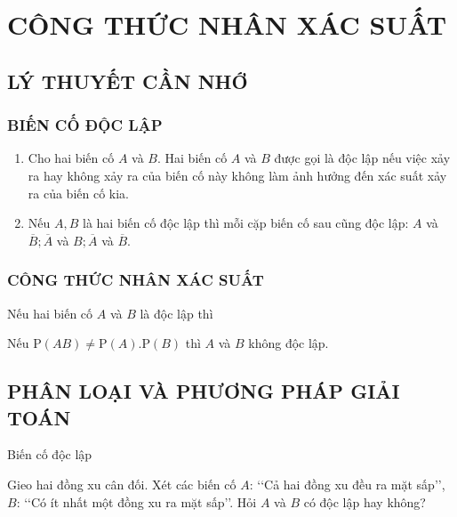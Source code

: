 \section{CÔNG THỨC NHÂN XÁC SUẤT}
\subsection{LÝ THUYẾT CẦN NHỚ}
\subsubsection{BIẾN CỐ ĐỘC LẬP}
\begin{enumerate}[\iconMT]
	\item {} Cho hai biến cố $A$ và $B$. Hai biến cố $A$ và $B$ được gọi là độc lập nếu việc xảy ra hay không xảy ra của biến cố này không làm ảnh hưởng đến xác suất xảy ra của biến cố kia.
	\item {} Nếu $A, B$ là hai biến cố độc lập thì mỗi cặp biến cố sau cũng độc lập: $A$ và $\overline{B} ; \overline{A}$ và $B ; \overline{A}$ và $\overline{B}$.
\end{enumerate}
\subsubsection{CÔNG THỨC NHÂN XÁC SUẤT}

Nếu hai biến cố $A$ và $B$ là độc lập thì 
\begin{luuy}
	Nếu $\mathrm{P}(A B)\ne \mathrm{P}(A) . \mathrm{P}(B)$ thì $A$ và $B$ không độc lập.
\end{luuy}


\subsection{PHÂN LOẠI VÀ PHƯƠNG PHÁP GIẢI TOÁN}

\begin{dang}{Biến cố độc lập}
\end{dang}

\begin{vd}%
	Gieo hai đồng xu cân đối. Xét các biến cố $A$: \lq\lq Cả hai đồng xu đều ra mặt sấp\rq\rq, $B$: \lq\lq Có ít nhất một đồng xu ra mặt sấp\rq\rq. Hỏi $A$ và $B$ có độc lập hay không?
\end{vd}

